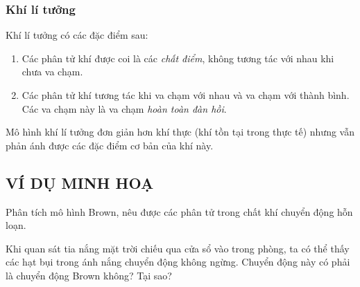 \begin{tomtat}
	\subsubsection{Khí lí tưởng}
	\begin{dn}
		Khí lí tưởng có các đặc điểm sau:
		\begin{enumerate}[label=\arabic*.]
			\item Các phân tử khí được coi là các \textit{chất điểm}, không tương tác với nhau khi chưa va chạm.
			\item Các phân tử khí tương tác khi va chạm với nhau và va chạm với thành bình. Các va chạm này là va chạm \textit{hoàn toàn đàn hồi}.
		\end{enumerate}
	\end{dn}
	\begin{luuy}
		Mô hình khí lí tưởng đơn giản hơn khí thực (khí tồn tại trong thực tế) nhưng vẫn phản ánh được các đặc điểm cơ bản của khí này.
	\end{luuy}
\end{tomtat}
\subsection{VÍ DỤ MINH HOẠ}
\begin{dang}{Phân tích mô hình Brown, nêu được các phân tử trong chất khí chuyển động hỗn loạn.}
	\end{dang}
	\begin{vd}
Khi quan sát tia nắng mặt trời chiếu qua cửa sổ vào trong phòng, ta có thể thấy các hạt bụi trong ánh nắng chuyển động không ngừng. Chuyển động này có phải là chuyển động Brown không? Tại sao?
	\end{vd}

